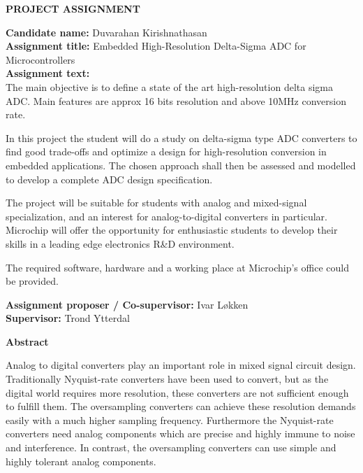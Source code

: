 \documentclass[pdftex,10pt,b5paper,twoside,openright]{report}
\begin{document}


\begin{center}
 \textbf{PROJECT ASSIGNMENT}\\[4ex]
\end{center}
\textbf{Candidate name:} Duvarahan Kirishnathasan\\[4ex]
\textbf{Assignment title:} Embedded High-Resolution Delta-Sigma ADC for Microcontrollers\\[4ex]
\textbf{Assignment text:}\\[2ex]
The main objective is to define a state of the art high-resolution delta sigma ADC. Main features are approx 16 bits resolution and above 10MHz conversion rate.

In this project the student will do a study on delta-sigma type ADC converters to find good trade-offs and optimize a design for high-resolution conversion in embedded applications. The chosen approach shall then be assessed and modelled to develop a complete ADC design specification.

The project will be suitable for students with analog and mixed-signal specialization, and an interest for analog-to-digital converters in particular. Microchip will offer the opportunity for enthusiastic students to develop their skills in a leading edge electronics R\&D environment.

The required software, hardware and a working place at Microchip’s office could be provided.


\textbf{Assignment proposer / Co-supervisor:} Ivar Løkken\\[4ex]
\textbf{Supervisor:} Trond Ytterdal



\begin{center}
    \textbf{Abstract}
\end{center}
Analog to digital converters play an important role in mixed signal circuit design. Traditionally Nyquist-rate converters have been used to convert, but as the digital world requires more resolution, these converters are not sufficient enough to fulfill them. The oversampling converters can achieve these resolution demands easily with a much higher sampling frequency. Furthermore the Nyquist-rate converters need analog components which are precise and highly immune to noise and interference. In contrast, the oversampling converters can use simple and highly tolerant analog components.



\tableofcontents
\listoffigures
\listoftables














\end{document}
